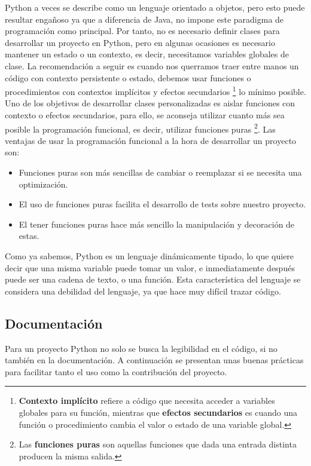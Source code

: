 Python a veces se describe como un lenguaje orientado a objetos, pero esto puede resultar engañoso ya que a diferencia de Java, no impone este paradigma de programación como principal. Por tanto, no es necesario definir clases para desarrollar un proyecto en Python, pero en algunas ocasiones es necesario mantener un estado o un contexto, es decir, necesitamos variables globales de clase. La recomendación a seguir es cuando nos querramos traer entre manos un código con contexto persistente o estado, debemos usar funciones o procedimientos con contextos implícitos y efectos secundarios \footnote{\textbf{Contexto implícito} refiere a código que necesita acceder a variables globales para su función, mientras que \textbf{efectos secundarios} es cuando una función o procedimiento cambia el valor  o estado de una variable global. } lo mínimo posible. Uno de los objetivos de desarrollar clases personalizadas es aislar funciones con contexto o efectos secundarios, para ello, se aconseja utilizar cuanto más sea posible la programación funcional, es decir, utilizar funciones puras \footnote{Las \textbf{funciones puras} son aquellas funciones que dada una entrada distinta producen la misma salida.}. Las ventajas de usar la programación funcional  a la hora de desarrollar un proyecto son:
\begin{itemize}
    \item Funciones puras son más sencillas de cambiar o reemplazar si se necesita una optimización.
    \item El uso de funciones puras facilita el desarrollo de tests sobre nuestro proyecto.
    \item El tener funciones puras hace más sencillo la manipulación y decoración de estas.
\end{itemize}
Como ya sabemos, Python es un lenguaje dinámicamente tipado, lo que quiere decir que una misma variable puede tomar un valor, e inmediatamente después puede ser una cadena de texto, o una función. Esta característica del lenguaje se considera una debilidad del lenguaje, ya que hace muy difícil trazar código.\\

\subsection*{Documentación}
Para un proyecto Python no solo se busca la legibilidad en el código, si no también en la documentación. A continuación se presentan unas buenas prácticas para facilitar tanto el uso como la contribución del proyecto. 

